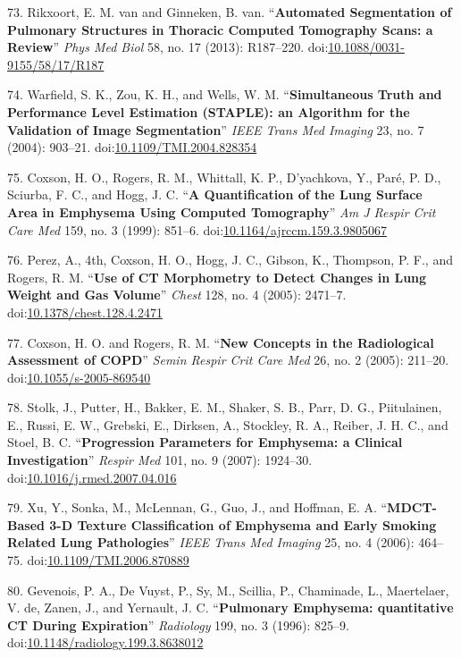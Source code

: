 \documentclass[11pt,]{article}
\begin{document}
73. Rikxoort, E. M. van and Ginneken, B. van. ``\textbf{Automated
Segmentation of Pulmonary Structures in Thoracic Computed Tomography
Scans: a Review}'' \emph{Phys Med Biol} 58, no. 17 (2013): R187--220.
doi:\href{http://dx.doi.org/10.1088/0031-9155/58/17/R187}{10.1088/0031-9155/58/17/R187}

74. Warfield, S. K., Zou, K. H., and Wells, W. M. ``\textbf{Simultaneous
Truth and Performance Level Estimation (STAPLE): an Algorithm for the
Validation of Image Segmentation}'' \emph{IEEE Trans Med Imaging} 23,
no. 7 (2004): 903--21.
doi:\href{http://dx.doi.org/10.1109/TMI.2004.828354}{10.1109/TMI.2004.828354}

75. Coxson, H. O., Rogers, R. M., Whittall, K. P., D'yachkova, Y.,
Par{é}, P. D., Sciurba, F. C., and Hogg, J. C. ``\textbf{A
Quantification of the Lung Surface Area in Emphysema Using Computed
Tomography}'' \emph{Am J Respir Crit Care Med} 159, no. 3 (1999):
851--6.
doi:\href{http://dx.doi.org/10.1164/ajrccm.159.3.9805067}{10.1164/ajrccm.159.3.9805067}

76. Perez, A., 4th, Coxson, H. O., Hogg, J. C., Gibson, K., Thompson, P.
F., and Rogers, R. M. ``\textbf{Use of CT Morphometry to Detect Changes
in Lung Weight and Gas Volume}'' \emph{Chest} 128, no. 4 (2005):
2471--7.
doi:\href{http://dx.doi.org/10.1378/chest.128.4.2471}{10.1378/chest.128.4.2471}

77. Coxson, H. O. and Rogers, R. M. ``\textbf{New Concepts in the
Radiological Assessment of COPD}'' \emph{Semin Respir Crit Care Med} 26,
no. 2 (2005): 211--20.
doi:\href{http://dx.doi.org/10.1055/s-2005-869540}{10.1055/s-2005-869540}

78. Stolk, J., Putter, H., Bakker, E. M., Shaker, S. B., Parr, D. G.,
Piitulainen, E., Russi, E. W., Grebski, E., Dirksen, A., Stockley, R.
A., Reiber, J. H. C., and Stoel, B. C. ``\textbf{Progression Parameters
for Emphysema: a Clinical Investigation}'' \emph{Respir Med} 101, no. 9
(2007): 1924--30.
doi:\href{http://dx.doi.org/10.1016/j.rmed.2007.04.016}{10.1016/j.rmed.2007.04.016}

79. Xu, Y., Sonka, M., McLennan, G., Guo, J., and Hoffman, E. A.
``\textbf{MDCT-Based 3-D Texture Classification of Emphysema and Early
Smoking Related Lung Pathologies}'' \emph{IEEE Trans Med Imaging} 25,
no. 4 (2006): 464--75.
doi:\href{http://dx.doi.org/10.1109/TMI.2006.870889}{10.1109/TMI.2006.870889}

80. Gevenois, P. A., De Vuyst, P., Sy, M., Scillia, P., Chaminade, L.,
Maertelaer, V. de, Zanen, J., and Yernault, J. C. ``\textbf{Pulmonary
Emphysema: quantitative CT During Expiration}'' \emph{Radiology} 199,
no. 3 (1996): 825--9.
doi:\href{http://dx.doi.org/10.1148/radiology.199.3.8638012}{10.1148/radiology.199.3.8638012}
\end{document}
